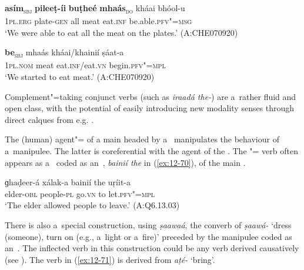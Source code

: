 \begin{exe}
\ex
\label{ex:12-68}
\gll {\ob}\textbf{asím}{\cb}\textsubscript{\textsc{\upshape sbj}} {\ob}\textbf{pileeṭ-íi} \textbf{buṭheé} \textbf{mhaás}{\cb}\textsubscript{\textsc{\upshape do}} kháai bhóol-u \\
\textsc{1pl.erg} plate-\textsc{gen} all meat eat.\textsc{inf} be.able.\textsc{pfv"=msg} \\
\glt `We were able to eat all the meat on the plates.' (A:CHE070920)
\end{exe}
\begin{exe}
\ex
\label{ex:12-69}
\gll {\ob}\textbf{be}{\cb}\textsubscript{\textsc{\upshape sbj}} mhaás kháai/khainií ṣáat-a \\
\textsc{1pl.nom} meat eat.\textsc{inf}/eat.\textsc{vn} begin.\textsc{pfv"=mpl} \\
\glt `We started to eat meat.' (A:CHE070920)
\end{exe}

Complement"=taking conjunct verbs (such as \textit{iraadá the-}) are a~rather fluid and open class, with the potential of easily introducing new modality senses through direct calques from e.g. \iliUrdu. 


 The (human) agent"= of a main  headed by a~ manipulates the behaviour of a~manipulee. The latter is coreferential with the agent of the . The "= verb often appears as a~ coded as an~, \textit{bainií the} in (\ref{ex:12-70}), of the main . 

\begin{exe}
\ex
\label{ex:12-70}
\gll ɡhaḍeer-á xálak-a bainií the uṛíit-a \\
elder-\textsc{obl} people-\textsc{pl} go.\textsc{vn} to let.\textsc{pfv"=mpl} \\
\glt `The elder allowed people to leave.' (A:Q6.13.03)
\end{exe}

There is also a~special  construction, using \textit{ṣaawaá}, the converb of \textit{ṣaawá-} `dress (someone), turn on (e.g., a~light or a~fire)' preceded by the manipulee coded as an~. The inflected  verb in this construction could be any verb derived causatively (see ). The  verb in (\ref{ex:12-71}) is derived from \textit{aṭé-} `bring'.

